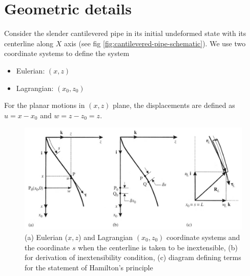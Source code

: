 \documentclass[12pt]{report}
\begin{document}
\section{Geometric details}
Consider the slender cantilevered pipe in its initial undeformed state with its centerline along $X$ axis (see fig \ref{fig:cantilevered-pipe-schematic}). We use two coordinate systems to define the system 
\begin{itemize}
	\item Eulerian: $(x,z)$
	\item Lagrangian: $(x_0, z_0)$
\end{itemize}
For the planar motions in $(x,z)$ plane, the displacements are defined as $u = x - x_0$ and $w = z - z_0 = z$.

\begin{figure}
	\centering
	\includegraphics[width=0.8\linewidth]{coordinate-system-pipe}
	\caption{(a) Eulerian ($x,z$) and Lagrangian $(x_0, z_0)$ coordinate systems and the coordinate $s$ when the centerline is taken to be inextensible, (b) for derivation of inextensibility condition, (c) diagram defining terms for the statement of Hamilton's principle}
	\label{fig:coordinate-system-pipe}
\end{figure}
\end{document}
